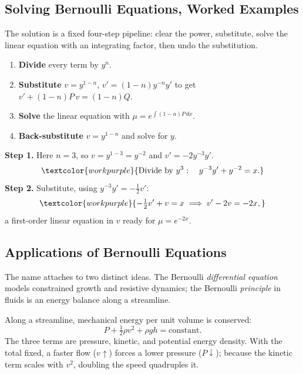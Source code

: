 \subsection{Solving Bernoulli Equations, Worked Examples}

The solution is a fixed four-step pipeline: clear the power, substitute, solve
the linear equation with an integrating factor, then undo the substitution.

\begin{methodbox}
\begin{enumerate}[leftmargin=1.6em, itemsep=2pt]
    \item \textbf{Divide} every term by $y^{n}$.
    \item \textbf{Substitute} $v = y^{1-n}$, $v' = (1-n)y^{-n}y'$ to get
          $v' + (1-n)P\,v = (1-n)Q$.
    \item \textbf{Solve} the linear equation with $\mu = e^{\int (1-n)P\,dx}$.
    \item \textbf{Back-substitute} $v = y^{1-n}$ and solve for $y$.
\end{enumerate}
\end{methodbox}

\begin{examplebox}[Worked Example 4.5: Reduce $y' + y = xy^{3}$]
\textbf{Step 1.} Here $n = 3$, so $v = y^{1-3} = y^{-2}$ and
$v' = -2y^{-3}y'$.
\[ \textcolor{workpurple}{\text{Divide by } y^{3}:\quad y^{-3}y' + y^{-2} = x.} \]
\textbf{Step 2.} Substitute, using $y^{-3}y' = -\tfrac{1}{2}v'$:
\[ \textcolor{workpurple}{-\tfrac{1}{2}v' + v = x \;\Longrightarrow\; v' - 2v = -2x,} \]
a first-order linear equation in $v$ ready for $\mu = e^{-2x}$.
\end{examplebox}

\subsection{Applications of Bernoulli Equations}

The name attaches to two distinct ideas. The Bernoulli \emph{differential
equation} models constrained growth and resistive dynamics; the Bernoulli
\emph{principle} in fluids is an energy balance along a streamline.

\begin{formulabox}
Along a streamline, mechanical energy per unit volume is conserved:
\[ P + \tfrac{1}{2}\rho v^{2} + \rho g h = \text{constant}. \]
The three terms are pressure, kinetic, and potential energy density. With the
total fixed, a faster flow ($v\uparrow$) forces a lower pressure ($P\downarrow$);
because the kinetic term scales with $v^{2}$, doubling the speed quadruples it.
\end{formulabox}

